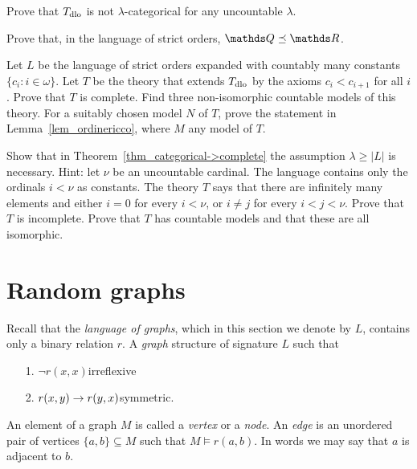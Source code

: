 \begin{exercise}
Prove that $T_{\rm dlo}$ is not $\lambda$-categorical for any uncountable $\lambda$.
\end{exercise}

\begin{exercise}
Prove that, in the language of strict orders, $\QQ\preceq\RR$.
\end{exercise}

\begin{exercise}\label{VaughtEsempio3modelli}
Let $L$ be the language of strict orders expanded with countably many constants $\big\{c_i: i\in\omega\big\}$.
Let $T$ be the theory that extends $T_{\rm dlo}$ by the axioms $c_i<c_{i+1}$ for all $i$.
Prove that $T$ is complete.
Find three non-isomorphic countable models of this theory.
For a suitably chosen model $N$ of $T$, prove the statement in Lemma~\ref{lem_ordinericco}, where $M$ any model of $T$.
\end{exercise}


\begin{exercise}\label{categorica->completa}
Show that in Theorem~\ref{thm_categorical->complete} the assumption $\lambda\ge|L|$ is necessary.
Hint: let $\nu$ be an uncountable cardinal.
The language contains only the ordinals $i<\nu$ as constants.
The theory $T$ says that there are infinitely many elements and either $i=0$ for every $i<\nu$, or $i\neq j$ for every $i<j<\nu$.
Prove that $T$ is incomplete.
Prove that $T$ has countable models and that these are all isomorphic.
\end{exercise}

\section{Random graphs}
\label{randomgraph}

Recall that the \emph{language of graphs}, which in this section we denote by $L$, contains only a binary relation $r$.
A \emph{graph\/} structure of signature $L$ such that

\begin{itemize}
\item[1.] $\neg r(x,x)$\hfill irreflexive
\item[2.] $r(x,y)\rightarrow r(y,x)$\hfill symmetric.
\end{itemize}

An element of a graph $M$ is called a \emph{vertex\/} or a \emph{node}.
An \emph{edge\/} is an unordered pair of vertices $\{a,b\}\subseteq M$ such that $M\models r(a,b)$.
In words we may say that $a$ is adjacent to $b$.

